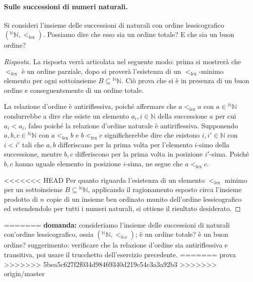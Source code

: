 \documentclass[fontsize = 11 pt, paper=A4, oneside, index=totoc, hyperref]{book}
\theoremstyle{definition}
\theoremstyle{plain}
\newcommand{\N}{\mathbb{N}}
\begin{document}
\paragraph{Sulle successioni di numeri naturali.} Si consideri l'insieme delle successioni di naturali con ordine lessicografico \(({}^\N\N, <_{\mathrm{lex}})\). Possiamo dire che esso sia un ordine totale? E che sia un buon ordine?
\begin{proof}[Risposta]
  La risposta verrà articolata nel seguente modo: prima si mostrerà che \(<_{\mathrm{lex}}\) è un ordine parziale, dopo si proverà l'esistenza di un \(<_{\mathrm{lex}}\)-minimo elemento per ogni sottoinsieme \(B \subseteq {}^\N\N\). Ciò prova che si è in presenza di un buon ordine e conseguentemente di un ordine totale.

  La relazione d'ordine è antiriflessiva, poiché affermare che \(a <_{\mathrm{lex}} a\) con \(a \in {}^\N\N\) condurrebbe a dire che esiste un elemento \(a_i, i \in \N\) della successione \(a\) per cui \(a_i < a_i\), falso poiché la relazione d'ordine naturale è antiriflessiva. Supponendo \(a,b,c \in {}^\N\N\) con \(a <_{\mathrm{lex}} b\) e \(b <_{\mathrm{lex}} c\) significherebbe dire che esistono \(i,i' \in \N\) con \(i < i'\) tali che \(a,b\) differiscano per la prima volta per l'elemento \(i\)-simo della successione, mentre \(b,c\) differiscono per la prima volta in posizione \(i'\)-sima. Poiché \(b,c\) hanno uguale elemento in posizione \(i\)-sima, ne segue che \(a <_{\mathrm{lex}} c\).

<<<<<<< HEAD
  Per quanto riguarda l'esistenza di un elemento \(<_{\mathrm{lex}}\) minimo per un sottoinsieme \(B \subseteq {}^\N\N\), applicando il ragionamento esposto circa l'insieme prodotto di \(n\) copie di un insieme ben ordinato munito dell'ordine lessicografico ed estendendolo per tutti i numeri naturali, si ottiene il risultato desiderato.
\end{proof}
=======
{\bf domanda:} consideriamo l'insieme delle successioni di naturali con'ordine lessicografico, ossia \(({}^\N\N, <_{lex})\); è un ordine totale? è un buon ordine? suggerimento: verificare che la relazione d'ordine sia antiriflessiva e transitiva, poi usare il trucchetto dell'esercizio precedente.
=======
prova
>>>>>>> 5bea5c627f2f034d98469340d219c54c3a3a92b3
>>>>>>> origin/master
\end{document}
